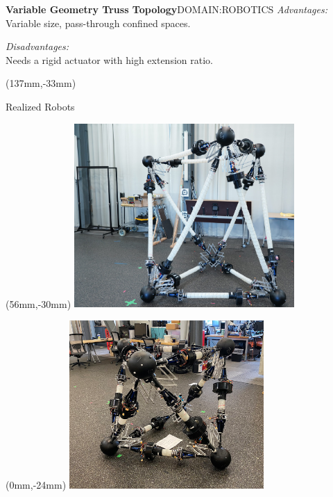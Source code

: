 \documentclass[11pt,aspectratio=169]{beamer}
\begin{document}
\begin{frame}[fragile]{\textbf{Variable Geometry Truss Topology}\hfill \fontsize{8}{8}\selectfont DOMAIN:ROBOTICS}
        \emph{Advantages:} \\
        Variable size, pass-through confined spaces.

        \medskip

        \emph{Disadvantages:} \\
        Needs a rigid actuator with high extension ratio.
 	
        \medskip

        \begin{textblock*}{5cm}(137mm,-33mm) %
        {\tiny \cite{10.1016/S0168-874X(99)00041-4}}
        \end{textblock*}
 
\end{frame}

\begin{frame}[fragile]{Realized Robots}

        \begin{textblock*}{5cm}(56mm,-30mm) %
        \includegraphics[height=70mm]{elements/[3]-R2.png}
        \end{textblock*}
    
        \begin{textblock*}{8cm}(0mm,-24mm) %
        \includegraphics[height=64mm]{elements/[2]-R1.png}
        \end{textblock*}


\end{frame}
\end{document}
